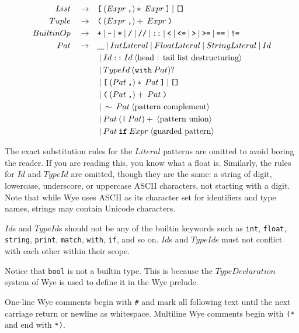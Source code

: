 \documentclass[a4paper, 12pt]{article}
\newcommand{\sepbar}{\: | \:}	%
\newcommand{\substo}{\quad\rightarrow\quad}
\newcommand{\uscore}{\underline{\hspace{0.3cm}}}
\begin{document}
\begin{align*}
List \substo& \texttt{[}\: (Expr \: \texttt{,})*\: Expr\: \texttt{]} \sepbar \texttt{[]}\\
Tuple \substo& \texttt{(}\: (Expr \: \texttt{,})+\: Expr\: \texttt{)}\\
BuiltinOp \substo& \texttt{+}\sepbar\texttt{-}\sepbar\texttt{*}\sepbar\texttt{/}\sepbar\texttt{//}\sepbar\texttt{::}\sepbar\texttt{<}\sepbar\texttt{<=}\sepbar\texttt{>}\sepbar\texttt{>=}\sepbar\texttt{==}\sepbar\texttt{!=}\\
Pat \substo& \uscore \sepbar IntLiteral\sepbar FloatLiteral\sepbar StringLiteral\sepbar Id \\
& \sepbar Id\:\texttt{::}\: Id\:\langle\text{head : tail list destructuring}\rangle\\
& \sepbar TypeId \: (\texttt{with}\: Pat)?\\
& \sepbar \texttt{[} \: ( Pat\:\texttt{,})*\: Pat \: \texttt{]} \sepbar  \texttt{[]}\\
& \sepbar \texttt{(} \: ( Pat\:\texttt{,})+\: Pat\: \texttt{)}\\
& \sepbar \sim\:Pat \:\langle\text{pattern complement}\rangle\\
& \sepbar Pat\: (\texttt{|}\: Pat)+\:\langle\text{pattern union}\rangle\\
& \sepbar Pat\:\texttt{if}\: Expr\:\langle\text{guarded pattern}\rangle
\end{align*}
\pagebreak

The exact substitution rules for the $Literal$ patterns are omitted to avoid boring the reader. If you are reading this, you know what a float is. Similarly, the rules for $Id$ and $TypeId$ are omitted, though they are the same: a string of digit, lowercase, underscore, or uppercase ASCII characters, not starting with a digit. Note that while Wye uses ASCII as its character set for identifiers and type names, strings may contain Unicode characters.

$Id$s and $TypeId$s should not be any of the builtin keywords such as \texttt{int}, \texttt{float}, \texttt{string}, \texttt{print}, \texttt{match}, \texttt{with}, \texttt{if}, and so on. $Id$s and $TypeId$s must not conflict with each other within their scope.

Notice that \texttt{bool} is not a builtin type. This is because the $TypeDeclaration$ system of Wye is used to define it in the Wye prelude.

One-line Wye comments begin with \texttt{\#} and mark all following text until the next carriage return or newline as whitespace. Multiline Wye comments begin with \texttt{(*} and end with \texttt{*)}.
\end{document}
